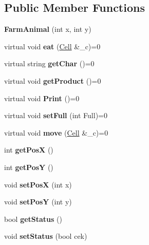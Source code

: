 \subsection*{Public Member Functions}
\begin{DoxyCompactItemize}
\item 
\mbox{\label{classFarmAnimal_adea13b232d5f3967a473e2e062d33ee8}} 
{\bfseries Farm\+Animal} (int x, int y)
\item 
\mbox{\label{classFarmAnimal_ab47da74e7a3644058d69b70b19508022}} 
virtual void {\bfseries eat} (\hyperlink{classCell}{Cell} \&\+\_\+c)=0
\item 
\mbox{\label{classFarmAnimal_ad636494e597db9fc13ffddd3a405bfeb}} 
virtual string {\bfseries get\+Char} ()=0
\item 
\mbox{\label{classFarmAnimal_ad236b0044f0feb479fafd90fde03f3c1}} 
virtual void {\bfseries get\+Product} ()=0
\item 
\mbox{\label{classFarmAnimal_a6e60fd2db37d4c521d9905310754ab85}} 
virtual void {\bfseries Print} ()=0
\item 
\mbox{\label{classFarmAnimal_a3a741d8636f20916bef977111e8e1657}} 
virtual void {\bfseries set\+Full} (int Full)=0
\item 
\mbox{\label{classFarmAnimal_ab083c4b544344e912e7c8cb372e3461e}} 
virtual void {\bfseries move} (\hyperlink{classCell}{Cell} \&\+\_\+c)=0
\item 
\mbox{\label{classFarmAnimal_ae554d658eaa9f4f6fc3971f8ab87c78a}} 
int {\bfseries get\+PosX} ()
\item 
\mbox{\label{classFarmAnimal_acbf8b1288f4ccb80610e87f7072e6838}} 
int {\bfseries get\+PosY} ()
\item 
\mbox{\label{classFarmAnimal_ada8a7127ac5ec7baec9277262b95178e}} 
void {\bfseries set\+PosX} (int x)
\item 
\mbox{\label{classFarmAnimal_a327c4fc53e4dc3a470a7cfb49942dfa5}} 
void {\bfseries set\+PosY} (int y)
\item 
\mbox{\label{classFarmAnimal_a6ab91d1c11fb077e4938f6c81ec5adaf}} 
bool {\bfseries get\+Status} ()
\item 
\mbox{\label{classFarmAnimal_a7166b5b2970eaf4c8e4376fa0b230c08}} 
void {\bfseries set\+Status} (bool cek)
\end{DoxyCompactItemize}
